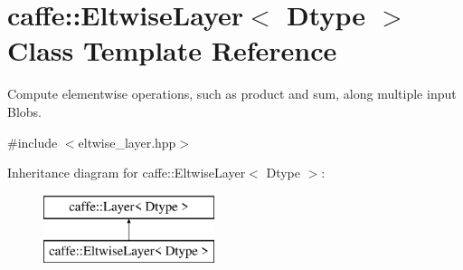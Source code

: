 \hypertarget{classcaffe_1_1EltwiseLayer}{}\section{caffe\+:\+:Eltwise\+Layer$<$ Dtype $>$ Class Template Reference}
\label{classcaffe_1_1EltwiseLayer}


Compute elementwise operations, such as product and sum, along multiple input Blobs.  




{\ttfamily \#include $<$eltwise\+\_\+layer.\+hpp$>$}

Inheritance diagram for caffe\+:\+:Eltwise\+Layer$<$ Dtype $>$\+:\begin{figure}[H]
\begin{center}
\leavevmode
\includegraphics[height=2.000000cm]{classcaffe_1_1EltwiseLayer}
\end{center}
\end{figure}
